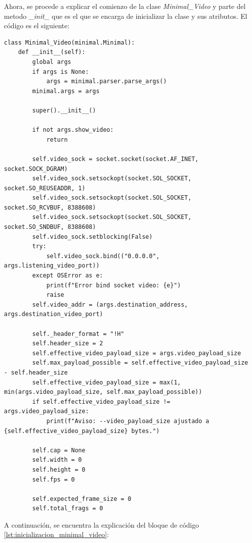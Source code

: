 Ahora, se procede a explicar el comienzo de la clase \textit{Minimal\_Video} y parte del metodo \textit{\_init\_} que es el que se encarga de inicializar la clase y sus atributos. El código es el siguiente:

\begin{lstlisting}[style=pythonstyle, caption={Comienzo de la clase \textit{Minimal\_Video} y parte de la inicialización}, label={lst:inicializacion_minimal_video}]
class Minimal_Video(minimal.Minimal):
    def __init__(self):
        global args
        if args is None:
            args = minimal.parser.parse_args()
        minimal.args = args

        super().__init__()

        if not args.show_video:
            return

        self.video_sock = socket.socket(socket.AF_INET, socket.SOCK_DGRAM)
        self.video_sock.setsockopt(socket.SOL_SOCKET, socket.SO_REUSEADDR, 1)
        self.video_sock.setsockopt(socket.SOL_SOCKET, socket.SO_RCVBUF, 8388608)
        self.video_sock.setsockopt(socket.SOL_SOCKET, socket.SO_SNDBUF, 8388608)
        self.video_sock.setblocking(False)
        try:
            self.video_sock.bind(("0.0.0.0", args.listening_video_port))
        except OSError as e:
            print(f"Error bind socket video: {e}")
            raise
        self.video_addr = (args.destination_address, args.destination_video_port)

        self._header_format = "!H"
        self.header_size = 2
        self.effective_video_payload_size = args.video_payload_size
        self.max_payload_possible = self.effective_video_payload_size - self.header_size
        self.effective_video_payload_size = max(1, min(args.video_payload_size, self.max_payload_possible))
        if self.effective_video_payload_size != args.video_payload_size:
            print(f"Aviso: --video_payload_size ajustado a {self.effective_video_payload_size} bytes.")

        self.cap = None
        self.width = 0
        self.height = 0
        self.fps = 0

        self.expected_frame_size = 0
        self.total_frags = 0
\end{lstlisting}

A continuación, se encuentra la explicación del bloque de código \ref{lst:inicializacion_minimal_video}:

